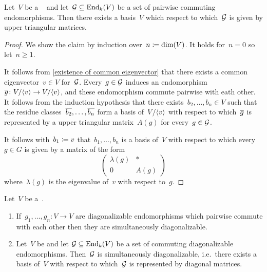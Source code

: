 \begin{corollary}
  \label{simultaneously triagbar}
  Let~$V$ be a {\fd}~{\kvs} and let~$\mathcal{G} \subseteq \operatorname{End}_k(V)$ be a set of pairwise commuting endomorphisms.
  Then there exists a basis~$V$ which respect to which~$\mathcal{G}$ is given by upper triangular matrices.
\end{corollary}


\begin{proof}
  We show the claim by induction over~$n \coloneqq \dim(V)$.
  It holds for~$n = 0$ so let~$n \geq 1$.
  
  It follows from \cref{existence of common eigenvector} that there exists a common eigenvector~$v \in V$ for~$\mathcal{G}$.
  Every~$g \in \mathcal{G}$ induces an endomorphism~$\overline{g} \colon V/\langle v\rangle \to V/\langle v\rangle$, and these endomorphism commute pairwise with eath other.
  It follows from the induction hypothesis that there exists~$b_2, \dotsc, b_n \in V$ such that the residue classes~$\overline{b_2}, \dotsc, \overline{b_n}$ form a basis of~$V/\langle v\rangle$ with respect to which~$\overline{g}$ is represented by a upper triangular matrix~$A(g)$ for every~$g \in \mathcal{G}$.
  
  It follows with~$b_1 \coloneqq v$ that~$b_1, \dotsc, b_n$ is a basis of~$V$ with respect to which every~$g \in G$ is given by a matrix of the form
  \[
    \begin{pmatrix}
      \lambda(g)  & *     \\
      0           & A(g)
    \end{pmatrix}
  \]
  where~$\lambda(g)$ is the eigenvalue of~$v$ with respect to~$g$.
\end{proof}


\begin{lemma}
  \label{simultaneous diagbar}
  Let~$V$ be a~{\kvs}.
  \begin{enumerate}
    \item
      \label{simultaneous diagbar for finitely many}
      If~$g_1, \dotsc, g_n \colon V \to V$ are diagonalizable endomorphisms which pairwise commute with each other then they are simultaneously diagonalizable.
    \item
      Let~$V$ be {\fd} and let $\mathcal{G} \subseteq \operatorname{End}_k(V)$ be a set of commuting diagonalizable endomorphisms.
      Then~$\mathcal{G}$ is simultaneously diagonalizable, i.e.\ there exists a basis of~$V$ with respect to which~$\mathcal{G}$ is represented by diagonal matrices.
  \end{enumerate}
\end{lemma}


